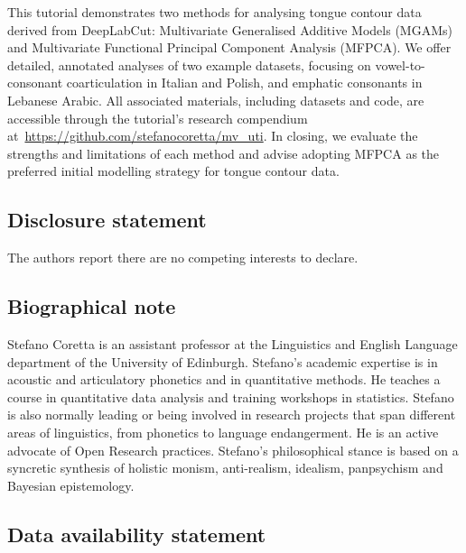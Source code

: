 \documentclass[
]{interact}
\begin{document}
This tutorial demonstrates two methods for analysing tongue contour data
derived from DeepLabCut: Multivariate Generalised Additive Models
(MGAMs) and Multivariate Functional Principal Component Analysis
(MFPCA). We offer detailed, annotated analyses of two example datasets,
focusing on vowel-to-consonant coarticulation in Italian and Polish, and
emphatic consonants in Lebanese Arabic. All associated materials,
including datasets and code, are accessible through the tutorial's
research compendium at~\url{https://github.com/stefanocoretta/mv_uti}.
In closing, we evaluate the strengths and limitations of each method and
advise adopting MFPCA as the preferred initial modelling strategy for
tongue contour data.

\subsection*{Disclosure statement}\label{disclosure-statement}

The authors report there are no competing interests to declare.

\subsection*{Biographical note}\label{biographical-note}

Stefano Coretta is an assistant professor at the Linguistics and English
Language department of the University of Edinburgh. Stefano's academic
expertise is in acoustic and articulatory phonetics and in quantitative
methods. He teaches a course in quantitative data analysis and training
workshops in statistics. Stefano is also normally leading or being
involved in research projects that span different areas of linguistics,
from phonetics to language endangerment. He is an active advocate of
Open Research practices. Stefano's philosophical stance is based on a
syncretic synthesis of holistic monism, anti-realism, idealism,
panpsychism and Bayesian epistemology.

\subsection*{\texorpdfstring{\textbf{Data availability
statement}}{Data availability statement}}\label{data-availability-statement}
\end{document}
